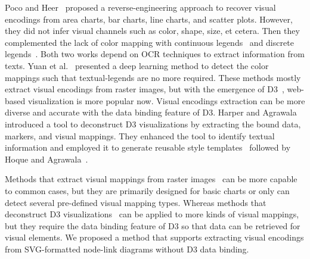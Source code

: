 Poco and Heer~\cite{DBLP:journals/cgf/PocoH17} proposed a reverse-engineering approach to recover visual encodings from area charts, bar charts, line charts, and scatter plots. However, they%
did not infer visual channels such as color, shape, size, et cetera.
Then they complemented the lack of color mapping with continuous legends~\cite{DBLP:journals/tvcg/PocoMH18} and discrete legends~\cite{DBLP:conf/sibgrapi/MayhuaNHP18}.
Both two works depend on OCR techniques to extract information from texts.
Yuan et al.~\cite{DBLP:journals/corr/abs-2103-00741} presented a deep learning method to detect the color mappings such that textual-legends are no more required.
These methods mostly extract visual encodings from raster images, but with the emergence of D3~\cite{DBLP:journals/tvcg/BostockOH11}, web-based visualization is more popular now.
Visual encodings extraction can be more diverse and accurate with the data binding feature of D3.
Harper and Agrawala~\cite{DBLP:conf/uist/HarperA14} introduced a tool to deconstruct D3 visualizations by extracting the bound data, markers, and visual mappings. 
They enhanced the tool to identify textual information and employed it to generate reusable style templates~\cite{DBLP:journals/tvcg/HarperA18} followed by Hoque and Agrawala~\cite{DBLP:journals/tvcg/HoqueA20}. %

Methods that extract visual mappings from raster images~\cite{DBLP:journals/cgf/PocoH17, DBLP:journals/tvcg/PocoMH18, DBLP:conf/sibgrapi/MayhuaNHP18, DBLP:journals/corr/abs-2103-00741} can be more capable to common cases, but they are primarily designed for basic charts or only can detect several pre-defined visual mapping types.
Whereas methods that deconstruct D3 visualizations~\cite{DBLP:conf/uist/HarperA14, DBLP:journals/tvcg/HarperA18, DBLP:journals/tvcg/HoqueA20} can be applied to more kinds of visual mappings, but they require the data binding feature of D3 so that data can be retrieved for visual elements. We proposed a method that supports extracting visual encodings from SVG-formatted node-link diagrams without D3 data binding.

